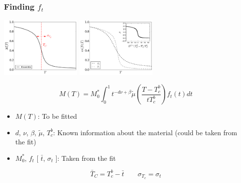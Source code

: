 \documentclass{beamer}
\begin{document}
\begin{frame}
	\frametitle{Finding $f_t$}

	\begin{center}
	\includegraphics[width=4cm]{Images/Aggregate} \hspace{3mm}
	\includegraphics[width=4cm]{Images/Ds}

	$$
	M(T) = M_0^*\int_0^1 t^{-d\nu +\beta} \tilde{\mu}\left(\frac{T-T_c^b}{tT_c^b}\right) f_t(t) dt
	$$

	\begin{itemize}
		\item{$M(T)$: To be fitted}
		\item{$d$, $\nu$, $\beta$, $\tilde{\mu}$, $T_c^b$: Known information about the material (could be taken from the fit)}
		\item{$M_0^*$, $f_t$ [ $\bar{t}$, $\sigma_t$ ]: Taken from the fit}
	\end{itemize}

	$$
	\bar{T}_C = T_c^b - \bar{t} \quad \quad \sigma_{T_c} = \sigma_t
	$$

	\end{center}
\end{frame}
\end{document}
